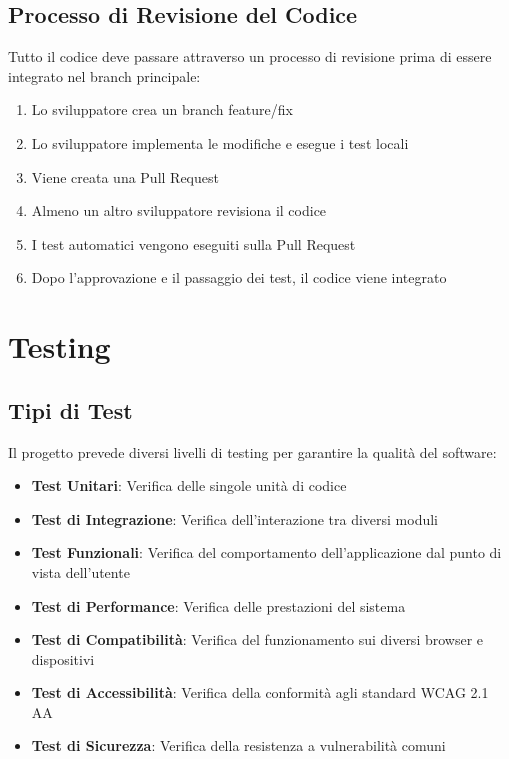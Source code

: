 \subsection{Processo di Revisione del Codice}
Tutto il codice deve passare attraverso un processo di revisione prima di essere integrato nel branch principale:

\begin{enumerate}
    \item Lo sviluppatore crea un branch feature/fix
    \item Lo sviluppatore implementa le modifiche e esegue i test locali
    \item Viene creata una Pull Request
    \item Almeno un altro sviluppatore revisiona il codice
    \item I test automatici vengono eseguiti sulla Pull Request
    \item Dopo l'approvazione e il passaggio dei test, il codice viene integrato
\end{enumerate}

\section{Testing}

\subsection{Tipi di Test}
Il progetto prevede diversi livelli di testing per garantire la qualità del software:

\begin{itemize}
    \item \textbf{Test Unitari}: Verifica delle singole unità di codice
    \item \textbf{Test di Integrazione}: Verifica dell'interazione tra diversi moduli
    \item \textbf{Test Funzionali}: Verifica del comportamento dell'applicazione dal punto di vista dell'utente
    \item \textbf{Test di Performance}: Verifica delle prestazioni del sistema
    \item \textbf{Test di Compatibilità}: Verifica del funzionamento sui diversi browser e dispositivi
    \item \textbf{Test di Accessibilità}: Verifica della conformità agli standard WCAG 2.1 AA
    \item \textbf{Test di Sicurezza}: Verifica della resistenza a vulnerabilità comuni
\end{itemize}

